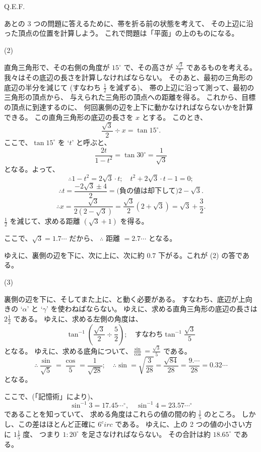 Q.E.F.

あとの 3 つの問題に答えるために、帯を折る前の状態を考えて、
その上辺に沿った頂点の位置を計算しよう。
これで問題は「平面」の上のものになる。

(2)

直角三角形で、その右側の角度が $15^\circ$ で、その高さが
$\frac{\sqrt{3}}{2}$ であるものを考える。
我々はその底辺の長さを計算しなければならない。
そのあと、最初の三角形の底辺の半分を減じて
(すなわち $\frac{1}{2}$ を減ずる)、
帯の上辺に沿って測って、最初の三角形の頂点から、
与えられた三角形の頂点への距離を得る。
これから、目標の頂点に到達するのに、
何回裏側の辺を上下に動かなければならないかを計算できる。
この直角三角形の底辺の長さを $x$ とする。
このとき、
\[
\frac{\sqrt{3}}{2} \div x = \tan 15^\circ.
\]
ここで、$\tan 15^\circ$ を `$t$' と呼ぶと、
\[
\frac{2t}{1 - t^2} = \tan 30^\circ = \frac{1}{\sqrt{3}}
\]
となる。よって、
\[
\therefore
1 - t^2 = 2 \sqrt{3} \cdot t;
\quad
t^2 + 2 \sqrt{3} \cdot t - 1 = 0;
\]
\[
\therefore
t = \frac{-2 \sqrt{3} \pm 4}{2}
= \mbox{(負の値は却下して)} 2 - \sqrt{3}.
\]
\[
\therefore
x = \frac{\sqrt{3}}{2(2 - \sqrt{3})}
= \frac{\sqrt{3}}{2} (2 + \sqrt{3})
= \sqrt{3} + \frac{3}{2}.
\]
$\frac{1}{2}$ を減じて、求める距離 $(\sqrt{3} + 1)$
を得る。

ここで、$\sqrt{3} = 1.7\cdots$ だから、
$\therefore$ 距離 $= 2.7 \cdots$ となる。

ゆえに、裏側の辺を下に、次に上に、次に約 $0.7$
下がる。これが (2) の答である。

(3)

裏側の辺を下に、そしてまた上に、と動く必要がある。
すなわち、底辺が上向きの `$\alpha$' と `$\gamma$'
を使わねばならない。
ゆえに、求める直角三角形の底辺の長さは $2 \frac{1}{2}$
である。
ゆえに、求める左側の角度は、
\[
\tan^{-1} \left( \frac{\sqrt{3}}{2} \div \frac{5}{2} \right);
\quad
\mbox{すなわち}
\tan^{-1} \frac{\sqrt{3}}{5}
\]
となる。
ゆえに、求める底角について、$\frac{\sin}{\cos} = \frac{\sqrt{3}}{5}$
である。
\[
\therefore
\frac{\sin}{\sqrt{5}} = \frac{\cos}{5}
= \frac{1}{\sqrt{28}};
\quad
\therefore
\sin = \sqrt{\frac{3}{28}}
= \frac{\sqrt{84}}{28}
= \frac{9.\cdots}{28}
= 0.32\cdots
\]
となる。

ここで、(「記憶術」により)、
\[
\sin^{-1} 3 = 17.45 \cdots^\circ,
\quad
\sin^{-1} 4 = 23.57 \cdots^\circ
\]
であることを知っていて、
求める角度はこれらの値の間の約 $\frac{1}{5}$ のところ。
しかし、この差はほとんど正確に $6^circ$ である。
ゆえに、上の 2 つの値の小さい方に $1 \frac{1}{5}$ 度、
つまり $1:20^\circ$ を足さなければならない。
その合計は約 $18.65^\circ$ である。

